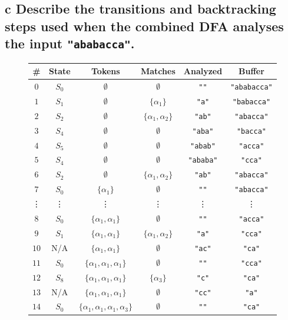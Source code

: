 \documentclass[11pt,a4paper]{article}
\begin{document}
\subsection*{c \mdseries Describe the transitions and backtracking steps used
when the combined DFA analyses the input {\tt "ababacca"}.}
\begin{figure}[H]
	\center
	\begin{tabular}{|c|c|c|c|c|c|}
		\hline
		{\bf \#} & {\bf State} & {\bf Tokens} & {\bf Matches} & {\bf Analyzed} & {\bf Buffer} \\ \hline
		$0$ & $S_0$ & $\emptyset$ & $\emptyset$ & {\tt ""} & {\tt "ababacca"}
		\\ \hline
		$1$ & $S_1$ & $\emptyset$ & $\{\alpha_1\}$ & {\tt "a"} & {\tt "babacca"}
		\\ \hline
		$2$ & $S_2$ & $\emptyset$ & $\{\alpha_1,\alpha_2\}$ & {\tt "ab"} & {\tt "abacca"}
		\\ \hline
		$3$ & $S_4$ & $\emptyset$ & $\emptyset$ & {\tt "aba"} & {\tt "bacca"}
		\\ \hline
		$4$ & $S_5$ & $\emptyset$ & $\emptyset$ & {\tt "abab"} & {\tt "acca"}
		\\ \hline
		$5$ & $S_4$ & $\emptyset$ & $\emptyset$ & {\tt "ababa"} & {\tt "cca"}
		\\ \hline
		$6$ & $S_2$ & $\emptyset$ & $\{\alpha_1,\alpha_2\}$ & {\tt "ab"} & {\tt "abacca"}
		\\ \hline
		$7$ & $S_0$ & $\{\alpha_1\}$ & $\emptyset$ & {\tt ""} & {\tt "abacca"}
		\\ \hline
		\vdots & \vdots & \vdots & \vdots & \vdots & \vdots
		\\ \hline
		$8$ & $S_0$ & $\{\alpha_1,\alpha_1\}$ & $\emptyset$ & {\tt ""} & {\tt "acca"}
		\\ \hline
		$9$ & $S_1$ & $\{\alpha_1,\alpha_1\}$ & $\{\alpha_1,\alpha_2\}$ & {\tt "a"} & {\tt "cca"}
		\\ \hline
		$10$ & N/A & $\{\alpha_1,\alpha_1\}$ & $\emptyset$ & {\tt "ac"} & {\tt "ca"}
		\\ \hline
		$11$ & $S_0$ & $\{\alpha_1,\alpha_1,\alpha_1\}$ & $\emptyset$ & {\tt ""} & {\tt "cca"}
		\\ \hline
		$12$ & $S_8$ & $\{\alpha_1,\alpha_1,\alpha_1\}$ & $\{\alpha_3\}$ & {\tt "c"} & {\tt "ca"}
		\\ \hline
		$13$ & N/A & $\{\alpha_1,\alpha_1,\alpha_1\}$ & $\emptyset$ & {\tt "cc"} & {\tt "a"}
		\\ \hline
		$14$ & $S_0$ & $\{\alpha_1,\alpha_1,\alpha_1,\alpha_3\}$ & $\emptyset$ & {\tt ""} & {\tt "ca"}

\end{tabular}
\end{figure}
\end{document}
